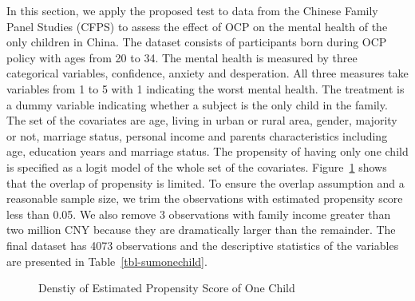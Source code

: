 \documentclass[
  12pt,
  12pt]{article}
\numberwithin{equation}{section}
\theoremstyle{definition}
\theoremstyle{plain}
\theoremstyle{plain}
\theoremstyle{remark}
\begin{document}
In this section, we apply the proposed test to data from the Chinese
Family Panel Studies (CFPS) \citep{xie2014introduction} to assess the
effect of OCP on the mental health of the only children in China. The
dataset consists of participants born during OCP policy with ages from
20 to 34. The mental health is measured by three categorical variables,
confidence, anxiety and desperation. All three measures take variables
from 1 to 5 with 1 indicating the worst mental health. The treatment is
a dummy variable indicating whether a subject is the only child in the
family. The set of the covariates are age, living in urban or rural
area, gender, majority or not, marriage status, personal income and
parents characteristics including age, education years and marriage
status. The propensity of having only one child is specified as a logit
model of the whole set of the covariates. Figure~\ref{fig-propden2}
shows that the overlap of propensity is limited. To ensure the overlap
assumption and a reasonable sample size, we trim the observations with
estimated propensity score less than 0.05. We also remove 3 observations
with family income greater than two million CNY because they are
dramatically larger than the remainder. The final dataset has 4073
observations and the descriptive statistics of the variables are
presented in Table~\ref{tbl-sumonechild}.

\begin{figure}


\caption{\label{fig-propden2}Denstiy of Estimated Propensity Score of
One Child}

\end{figure}%
\end{document}
